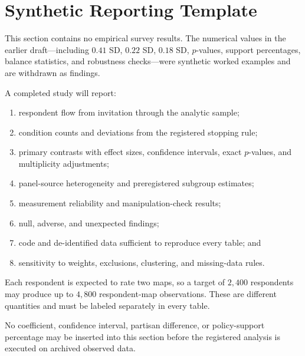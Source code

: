 \section{Synthetic Reporting Template}
\label{sec:results}

This section contains no empirical survey results. The numerical values in the
earlier draft---including $0.41$ SD, $0.22$ SD, $0.18$ SD, $p$-values, support
percentages, balance statistics, and robustness checks---were synthetic worked
examples and are withdrawn as findings.

A completed study will report:

\begin{enumerate}
\item respondent flow from invitation through the analytic sample;
\item condition counts and deviations from the registered stopping rule;
\item primary contrasts with effect sizes, confidence intervals, exact
$p$-values, and multiplicity adjustments;
\item panel-source heterogeneity and preregistered subgroup estimates;
\item measurement reliability and manipulation-check results;
\item null, adverse, and unexpected findings;
\item code and de-identified data sufficient to reproduce every table; and
\item sensitivity to weights, exclusions, clustering, and missing-data rules.
\end{enumerate}

Each respondent is expected to rate two maps, so a target of $2{,}400$
respondents may produce up to $4{,}800$ respondent-map observations. These are
different quantities and must be labeled separately in every table.

No coefficient, confidence interval, partisan difference, or policy-support
percentage may be inserted into this section before the registered analysis is
executed on archived observed data.
